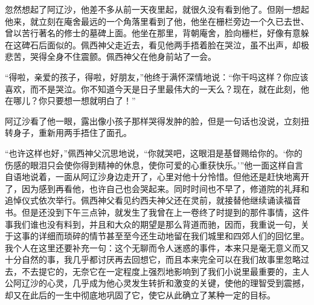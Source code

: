 忽然想起了阿辽沙，他差不多从前一天夜里起，就很久没有看到他了。但刚一想起他来，就立刻在庵舍最远的一个角落里看到了他，他坐在栅栏旁边一个久已去世、曾以苦行著名的修士的墓碑上面。他坐在那里，背朝庵舍，脸向栅栏，好像有意躲在这碑石后面似的。佩西神父走近去，看见他两手捂着脸在哭泣，虽不出声，却极悲苦，哭得全身不住震颤。佩西神父在他身前站了一会。
\par “得啦，亲爱的孩子，得啦，好朋友，”他终于满怀深情地说：“你干吗这样？你应该喜欢，而不是哭泣。你不知道今天是日子里最伟大的一天么？现在，就在此刻，他在哪儿？你只要想一想就明白了！”
\par 阿辽沙看了他一眼，露出像小孩子那样哭得发肿的脸，但是一句话也没说，立刻扭转身子，重新用两手捂住了面孔。
\par “也许这样也好，”佩西神父沉思地说，“你就哭吧，这眼泪是基督赐给你的。‘你的伤感的眼泪只会使你得到精神的休息，使你可爱的心重获快乐。’”他一面这样自言自语地说着，一面从阿辽沙身边走开了，心里对他十分怜惜。但他还是赶快地离开了，因为感到再看他，也许自己也会哭起来。同时时间也不早了，修道院的礼拜和追悼仪式依次举行。佩西神父看见约西夫神父还在灵前，就接替他继续诵读福音书。但是还没到下午三点钟，就发生了我曾在上一卷终了时提到的那件事情，这件事我们谁也没有料到，并且和大众的期望是那么背道而驰，因而，我重说一句，关于这事的详细而琐碎的情节甚至至今还生动地留在我们城里和四郊人们的回忆里。我个人在这里还要补充一句：这个无聊而令人迷惑的事件，本来只是毫无意义而又十分自然的事，我几乎都讨厌再去回想它，而且本来完全可以在我们故事里忽略过去，不去提它的，无奈它在一定程度上强烈地影响到了我们小说里最重要的，主人公阿辽沙的心灵，几乎成为他心灵发生转折和激变的关键，使他的理智受到震撼，却又在此后的一生中彻底地巩固了它，使它从此确立了某种一定的目标。
